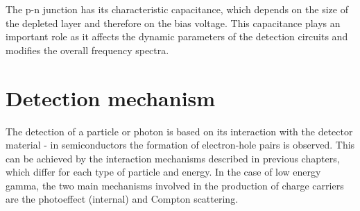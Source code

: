 \par
The p-n junction has its characteristic capacitance, which depends on the size of the depleted layer and therefore on the bias voltage.
This capacitance plays an important role as it affects the dynamic parameters of the detection circuits and modifies the overall frequency spectra.
%
%
%
%
%



\section{Detection mechanism}
The detection of a particle or photon is based on its interaction with the detector material - in semiconductors the formation of electron-hole pairs is observed. This can be achieved by the interaction mechanisms described in previous chapters, which differ for each type of particle and energy. In the case of low energy gamma, the two main mechanisms involved in the production of charge carriers are the photoeffect (internal) and Compton scattering.


